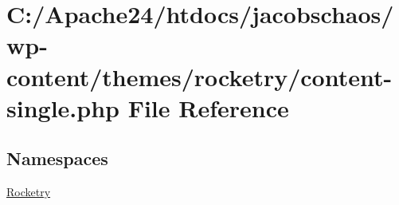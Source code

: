 \hypertarget{content-single_8php}{}\section{C\+:/\+Apache24/htdocs/jacobschaos/wp-\/content/themes/rocketry/content-\/single.php File Reference}
\label{content-single_8php}
\subsection*{Namespaces}
\begin{DoxyCompactItemize}
\item 
 \hyperlink{namespace_rocketry}{Rocketry}
\end{DoxyCompactItemize}
